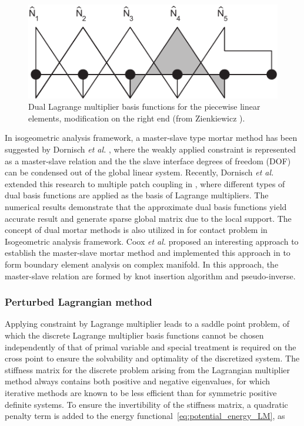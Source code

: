 \documentclass[preprint,12pt]{elsarticle}
\theoremstyle{remark}
\begin{document}
\begin{figure}
    \centering
    \includegraphics[width=.7\linewidth]{dual_mortar_basis}
    \caption{Dual Lagrange multiplier basis functions for the piecewise linear elements, modification on the right end (from Zienkiewicz \cite{zienkiewicz1977finite}).}\label{fig:dual_mortar_basis}
\end{figure}

In isogeometric analysis framework, a master-slave type mortar method has been suggested by Dornisch \textit{et al.} \cite{dornisch_weak_2015}, where the weakly applied constraint is represented as a master-slave relation and the the slave interface degrees of freedom (DOF) can be condensed out of the global linear system. Recently, Dornisch \textit{et al.} extended this research to multiple patch coupling in \cite{dornisch_patch_2016,dornisch_dual_2017}, where different types of dual basis functions are applied as the basis of Lagrange multipliers. The numerical results demonstrate that the approximate dual basis functions yield accurate result and generate sparse global matrix due to the local support. The concept of dual mortar methods is also utilized in \cite{seitz_isogeometric_2016} for contact problem in Isogeometric analysis framework. Coox \textit{et al.} \cite{coox_robust_2017} proposed an interesting approach to establish the master-slave mortar method and implemented this approach in \cite{coox_isogeometric_2017} to form boundary element analysis on complex manifold. In this approach, the master-slave relation are formed by knot insertion algorithm and pseudo-inverse. \par

\subsubsection{Perturbed Lagrangian method}
Applying constraint by Lagrange multiplier leads to a saddle point problem, of which the discrete Lagrange multiplier basis functions cannot be chosen independently of that of primal variable and special treatment is required on the cross point to ensure the solvability and optimality of the discretized system. The stiffness matrix for the discrete problem arising from the Lagrangian multiplier method always contains both positive and negative eigenvalues, for which iterative methods are known to be less efficient than for symmetric positive definite systems. To ensure the invertibility of the stiffness matrix, a quadratic penalty term is added to the energy functional~\eqref{eq:potential_energy_LM}, as
\end{document}
